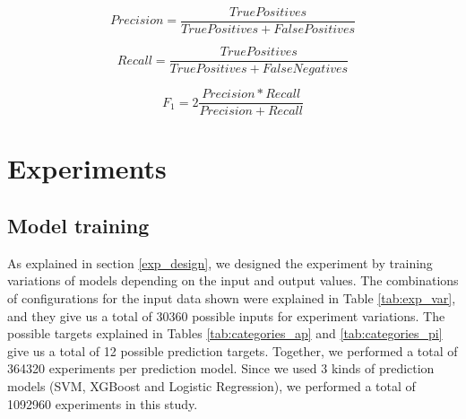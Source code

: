 \documentclass[review]{elsarticle}
\begin{document}
\begin{equation}\label{eq:6}
Precision = \frac{True Positives}{True Positives + False Positives}
\end{equation}

\begin{equation}\label{eq:7}
Recall = \frac{True Positives}{True Positives + False Negatives}
\end{equation}

\begin{equation}\label{eq:8}
F_{1} = 2  \frac{Precision * Recall}{Precision + Recall}
\end{equation}

\section{Experiments}
\label{experiments}

\subsection{Model training}
\label{model_training}

As explained in section \ref{exp_design}, we designed the experiment by training variations of models depending on the input and output values. The combinations of configurations for the input data shown were explained in Table \ref{tab:exp_var}, and they give us a total of \num[group-separator={,}]{30360} possible inputs for experiment variations. The possible targets explained in Tables \ref{tab:categories_ap} and \ref{tab:categories_pi} give us a total of 12 possible prediction targets. Together, we performed a total of \num[group-separator={,}]{364320} experiments per prediction model. Since we used 3 kinds of prediction models (SVM, XGBoost and Logistic Regression), we performed a total of \num[group-separator={,}]{1092960} experiments in this study.

\end{document}
